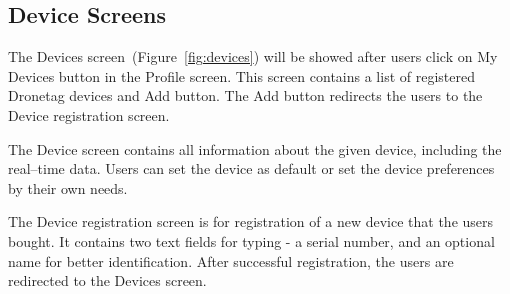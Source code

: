 \subsection{Device Screens}\label{subsec:device-screens}
The Devices screen~(Figure~\ref{fig:devices}) will be showed after users click on My Devices button in the Profile screen.
This screen contains a list of registered Dronetag devices and Add button.
The Add button redirects the users to the Device registration screen.

The Device screen contains all information about the given device, including the real--time data.
Users can set the device as default or set the device preferences by their own needs.

The Device registration screen is for registration of a new device that the users bought.
It contains two text fields for typing - a serial number, and an optional name for better identification.
After successful registration, the users are redirected to the Devices screen.
